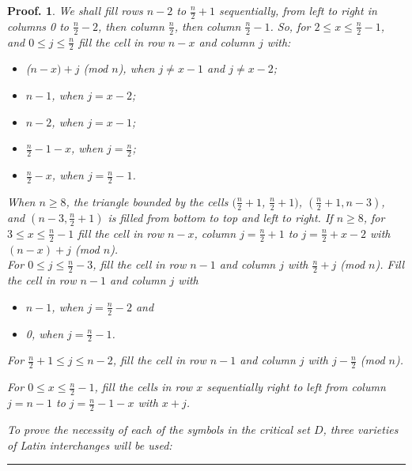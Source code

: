 \documentclass[12pt]{report}
\newtheorem{preproof}{{\bf Proof.}}
\newenvironment{proof}[1]{\begin{preproof}{\rm
               #1}\hfill{\rule[-0.5mm]{2mm}{2mm}}}{\end{preproof}}
\begin{document}
\begin{proof}
{\noindent We shall fill rows $n-2$ to $\displaystyle{\frac{n}{2}}+1$ sequentially, from
left to right in columns 0 to $\displaystyle{\frac{n}{2}} - 2$,
then column $\displaystyle{\frac{n}{2}}$,
then column $\displaystyle{\frac{n}{2}} - 1$.  So, for $2 \leq x \leq \displaystyle{\frac{n}{2}} - 1$, and $0 \leq j \leq \displaystyle{\frac{n}{2}}$
fill the cell in row $n-x$ and column $j$ with:
\begin{itemize}
\item[{}] ($n-x)+j$ (mod $n$), when $j \neq x - 1$ and $j \neq x - 2$;
\item[{}] $n-1$, when $j = x - 2$;
\item[{}] $n-2$, when $j = x - 1$;
\item[{}] $\displaystyle{\frac{n}{2}} - 1 - x$, when $j = \displaystyle{\frac{n}{2}}$;
\item[{}] $\displaystyle{\frac{n}{2}}-x$, when $j = \displaystyle{\frac{n}{2}} - 1$.
\end{itemize}
\noindent When $n \geq 8$,
the triangle bounded by the cells $(\displaystyle{\frac{n}{2}}+1$, $\displaystyle{\frac{n}{2}}+1)$,
$(\displaystyle{\frac{n}{2}}+1, n-3)$, and $(n-3, \displaystyle{\frac{n}{2}}+1)$ is filled from
bottom to top and left to right.
\noindent If $n \geq 8$, for $3 \leq x \leq \displaystyle{\frac{n}{2}}-1$ fill the cell in row $n-x$,
column $j=\displaystyle{\frac{n}{2}}+1$ to $j=\displaystyle{\frac{n}{2}}+x-2$
with $(n-x)+j$ (mod $n$). \\
\noindent For $0 \leq j \leq \displaystyle{\frac{n}{2}} - 3$, fill the cell in row $n-1$ and column $j$ with
$\displaystyle{\frac{n}{2}}+j$ (mod $n$).  Fill the cell in row $n-1$ and column $j$ with
\begin{itemize} 
\item[{}] $n-1$, when $j = \displaystyle{\frac{n}{2}} - 2$ and
\item[{}] 0, when $j = \displaystyle{\frac{n}{2}} - 1$.
\end{itemize}

\noindent For $\displaystyle{\frac{n}{2}} + 1 \leq j \leq n - 2$, fill the cell in row $n-1$ and column $j$ with $j-\displaystyle{\frac{n}{2}}$ (mod $n$).

\noindent For $0 \leq x \leq \displaystyle{\frac{n}{2}} - 1$, fill the cells in row $x$ sequentially
right to left from column $j = n - 1$ to $j = \displaystyle{\frac{n}{2}} - 1 - x$ with $x+j$.

To prove the necessity of each of the symbols in the critical set $D$, 
three varieties of Latin interchanges will be used:

}
\end{proof}
\end{document}
